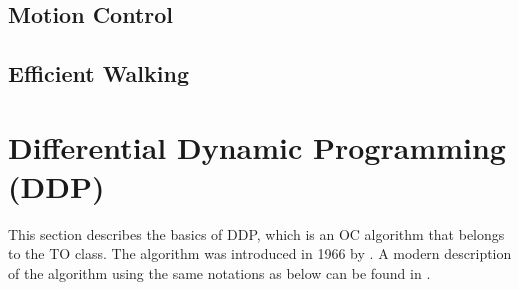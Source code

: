 \subsection{Motion Control}
\subsection{Efficient Walking}

\section{Differential Dynamic Programming (DDP)}

This section describes the basics of \gls{DDP}, which is an \gls{OC} algorithm that belongs to the \gls{TO} class. The algorithm was introduced in 1966 by \citeauthor{mayne1966} \citep{mayne1966}. A modern description of the algorithm using the same notations as below can be found in \cite{tassa2012synthesis, tassa2014control}.
